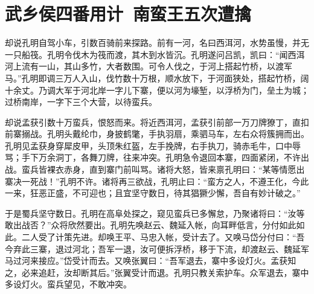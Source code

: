 \chapter{武乡侯四番用计~南蛮王五次遭擒}

却说孔明自驾小车，引数百骑前来探路。前有一河，名曰西洱河，水势虽慢，并无一只船筏。孔明令伐木为筏而渡，其木到水皆沉。孔明遂问吕凯，凯曰：“闻西洱河上流有一山，其山多竹，大者数围。可令人伐之，于河上搭起竹桥，以渡军马。”孔明即调三万人入山，伐竹数十万根，顺水放下，于河面狭处，搭起竹桥，阔十余丈。乃调大军于河北岸一字儿下寨，便以河为壕堑，以浮桥为门，垒土为城；过桥南岸，一字下三个大营，以待蛮兵。

却说孟获引数十万蛮兵，恨怒而来。将近西洱河，孟获引前部一万刀牌獠丁，直扣前寨搦战。孔明头戴纶巾，身披鹤氅，手执羽扇，乘驷马车，左右众将簇拥而出。孔明见孟获身穿犀皮甲，头顶朱红盔，左手挽牌，右手执刀，骑赤毛牛，口中辱骂；手下万余洞丁，各舞刀牌，往来冲突。孔明急令退回本寨，四面紧闭，不许出战。蛮兵皆裸衣赤身，直到寨门前叫骂。诸将大怒，皆来禀孔明曰：“某等情愿出寨决一死战！”孔明不许。诸将再三欲战，孔明止曰：“蛮方之人，不遵王化，今此一来，狂恶正盛，不可迎也；且宜坚守数日，待其猖獗少懈，吾自有妙计破之。”

于是蜀兵坚守数日。孔明在高阜处探之，窥见蛮兵已多懈怠，乃聚诸将曰：“汝等敢出战否？”众将欣然要出。孔明先唤赵云、魏延入帐，向耳畔低言，分付如此如此。二人受了计策先进。却唤王平、马忠入帐，受计去了。又唤马岱分付曰：“吾今弃此三寨，退过河北；吾军一退，汝可便拆浮桥，移于下流，却渡赵云、魏延军马过河来接应。”岱受计而去。又唤张翼曰：“吾军退去，寨中多设灯火。孟获知之，必来追赶，汝却断其后。”张翼受计而退。孔明只教关索护车。众军退去，寨中多设灯火。蛮兵望见，不敢冲突。

